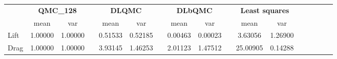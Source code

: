 \begin{tabular}{lcccccccccccccccc}
\toprule
 &\multicolumn{2}{c}{\textbf{QMC\_128}}&&\multicolumn{2}{c}{\textbf{DLQMC}}&&\multicolumn{2}{c}{\textbf{DLbQMC}}&&\multicolumn{2}{c}{\textbf{Least squares}}\\ 
\cmidrule(r){2-3} \cmidrule(r){5-6} \cmidrule(r){8-9}
 &mean&var&&mean&var&&mean&var&&mean&var\\ 
\midrule
Lift &1.00000&1.00000&&0.51533&0.52185&&0.00463&0.00023&&3.63056&1.26900\\ 
Drag &1.00000&1.00000&&3.93145&1.46253&&2.01123&1.47512&&25.00905&0.14288\\ 
\bottomrule
\end{tabular}

